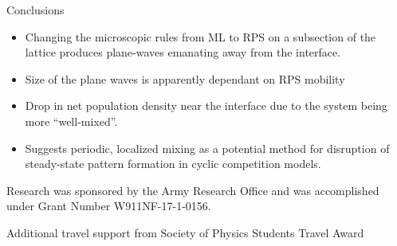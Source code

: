 \documentclass{beamer}
\begin{document}


    \begin{frame}[t]{Conclusions}
                
        \begin{itemize}
            \item Changing the microscopic rules from ML to RPS on a subsection of the lattice
                produces plane-waves emanating away from the interface.
            \item Size of the plane waves is apparently dependant on RPS mobility
            \item Drop in net population density near the interface due to the system
                being more ``well-mixed''.
            \item Suggests periodic, localized mixing as a potential method for disruption 
                of steady-state pattern formation in cyclic competition models.
        \end{itemize}

            \vspace{10pt}

            \footnotesize {Research was sponsored by the Army Research Office and was
                accomplished under Grant Number W911NF-17-1-0156.

                \vspace{5pt}

                Additional travel support from Society of Physics Students Travel Award
            }

    \end{frame}
\end{document}
